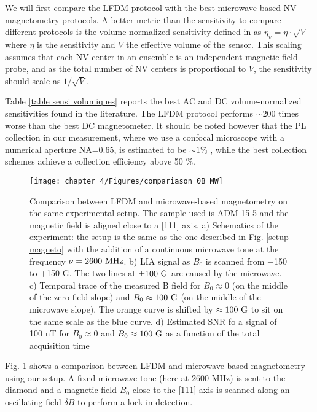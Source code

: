 \documentclass[a4paper,11pt]{report}
\begin{document}
\begin{refsection}
We will first compare the LFDM protocol with the best microwave-based NV magnetometry protocols. A better metric than the sensitivity to compare different protocols is the volume-normalized sensitivity defined in \citep{zhou2020quantum} as $\eta_v=\eta\cdot \sqrt{V}$ where $\eta$ is the sensitivity and $V$ the effective volume of the sensor. This scaling assumes that each NV center in an ensemble is an independent magnetic field probe, and as the total number of NV centers is proportional to $V$, the sensitivity should scale as $1/\sqrt{V}$.

Table \ref{table sensi volumiques} reports the best AC and DC volume-normalized sensitivities found in the literature. The LFDM protocol performs $\sim 200$ times worse than the best DC magnetometer. It should be noted however that the PL collection in our measurement, where we use a confocal microscope with a numerical aperture NA=0.65, is estimated to be $\sim 1 \%$ \citep{le2012efficient}, while the best collection schemes \citep{le2012efficient,wolf2015subpicotesla,wang2022picotesla, alsid2022solid} achieve a collection efficiency above 50 \%.

\begin{figure}[h!]
\centering
\texttt{[image: chapter 4/Figures/compariason\_0B\_MW]}
\caption{Comparison between LFDM and microwave-based magnetometry on the same experimental setup. The sample used is ADM-15-5 and the magnetic field is aligned close to a [111] axis. a) Schematics of the experiment: the setup is the same as the one described in Fig. \ref{setup magneto} with the addition of a continuous microwave tone at the frequency $\nu=2600\ \rm MHz$. b) LIA signal as $B_0$ is scanned from $-$150 to +150 G. The two lines at $\pm 100\ \rm G$ are caused by the microwave. c) Temporal trace of the measured B field for $B_0 \approx 0$ (on the middle of the zero field slope) and $B_0 \approx 100\ \rm G$ (on the middle of the microwave slope). The orange curve is shifted by $\approx 100\ \rm G$ to sit on the same scale as the blue curve. d) Estimated SNR fo a signal of 100 nT for $B_0 \approx 0$ and $B_0 \approx 100\ \rm G$ as a function of the total acquisition time}
\label{comparaison 0B MW}
\end{figure}

Fig. \ref{comparaison 0B MW} shows a comparison between LFDM and microwave-based magnetometry using our setup. A fixed microwave tone (here at 2600 MHz) is sent to the diamond and a magnetic field $B_0$ close to the [111] axis is scanned along an oscillating field $\delta B$ to perform a lock-in detection. 


\end{refsection}
\end{document}

